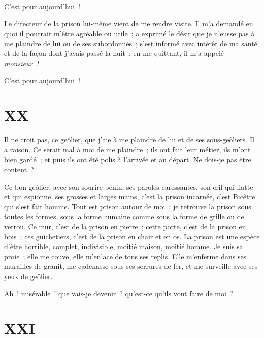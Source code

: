 \documentclass[french,twoside]{book} %
\begin{document}
\noindent C’est pour aujourd’hui !\par
Le directeur de la prison lui-même vient de me rendre visite. Il m’a demandé en quoi il pourrait m’être agréable ou utile ; a exprimé le désir que je n’eusse pas à me plaindre de lui ou de ses subordonnés ; s’est informé avec intérêt de ma santé et de la façon dont j’avais passé la nuit ; en me quittant, il m’a appelé \emph{monsieur !}\par
C’est pour aujourd’hui !
 \section[{XX}]{XX}
\label{ch20}\renewcommand{\leftmark}{XX}

\noindent Il ne croit pas, ce geôlier, que j’aie à me plaindre de lui et de ses sous-geôliers. Il a raison. Ce serait mal à moi de me plaindre ; ils ont fait leur métier, ils m’ont bien gardé ; et puis ils ont été polis à l’arrivée et au départ. Ne dois-je pas être content ?\par
Ce bon geôlier, avec son sourire bénin, ses paroles caressantes, son œil qui flatte et qui espionne, ses grosses et larges mains, c’est la prison incarnée, c’est Bicêtre qui s’est fait homme. Tout est prison autour de moi ; je retrouve la prison sous toutes les formes, sous la forme humaine comme sous la forme de grille ou de verrou. Ce mur, c’est de la prison en pierre ; cette porte, c’est de la prison en bois ; ces guichetiers, c’est de la prison en chair et en os. La prison est une espèce d’être horrible, complet, indivisible, moitié maison, moitié homme. Je suis sa proie ; elle me couve, elle m’enlace de tous ses replis. Elle m’enferme dans ses murailles de granit, me cadenasse sous ses serrures de fer, et me surveille avec ses yeux de geôlier.\par
Ah ! misérable ! que vais-je devenir ? qu’est-ce qu’ils vont faire de moi ?
 \section[{XXI}]{XXI}
\label{ch21}\renewcommand{\leftmark}{XXI}
\end{document}
